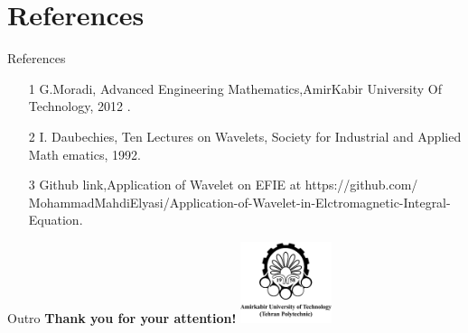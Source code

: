 \documentclass{beamer}
\begin{document}
\section{References}
\begin{frame}{References}
    \begin{itemize}
        \item [1] G.Moradi, Advanced Engineering Mathematics,AmirKabir University Of Technology,
        2012 .
        \item [2] I. Daubechies, Ten Lectures on Wavelets, Society for Industrial and Applied Math
       ematics, 1992.
        \item [3] Github link,Application of Wavelet on EFIE at https://github.com/
        MohammadMahdiElyasi/Application-of-Wavelet-in-Elctromagnetic-Integral-Equation.
    \end{itemize}
\end{frame}

\begin{frame}{Outro}
    \centering
    {\Large \textbf{Thank you for your attention!}} \vspace{1cm} %
    \vfill %
    \includegraphics[width=0.2\textwidth]{amirkabir.png} %
\end{frame}
\end{document}
